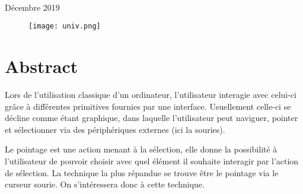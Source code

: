 \documentclass[a4paper, 12pt]{article}
\begin{document}


\begin{titlepage}
\center

\textsc{\LARGE \univ}\\[1.5cm]
\textsc{\master}\\[0.5cm]
\textsc{\large \matiere}\\[0.5cm]

\HRule \\[0.4cm]
    { \huge \bfseries \thetitle}\\[0.4cm]
\HRule \\[1.5cm]


\vspace{2.3cm}
{\large Décembre 2019}\\[1.5cm]

\vspace{1.05cm}
\begin{figure}[H]
	\centering
  	\texttt{[image: univ.png]}
\end{figure}

\end{titlepage}
\pagebreak

\section*{Abstract}

Lors de l'utilisation classique d'un ordinateur, l'utilisateur interagie avec celui-ci grâce à différentes primitives fournies par une interface. Usuellement celle-ci se décline comme étant graphique, dans laquelle l'utilisateur peut naviguer, pointer et sélectionner via des périphériques externes (ici la souries).

Le pointage est une action menant à la sélection, elle donne la possibilité à l'utilisateur de pouvoir choisir avec quel élément il souhaite interagir par l'action de sélection. La technique la plus répandue se trouve être le pointage via le curseur sourie. On s'intéressera donc à cette technique.
\end{document}
